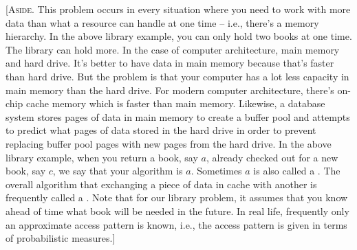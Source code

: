 [\textsc{Aside}. This problem occurs in every situation
where you need to work with more data than what a resource can handle
at one time -- i.e., there's a memory hierarchy.
In the above library example, you can only hold two books at one time.
The library can hold more.
In the case of computer architecture, main memory and hard drive.
It's better to have data in main memory
because that's faster than hard drive. But the problem is that
your computer has a lot less capacity in main memory than the hard drive.
For modern computer architecture, there's on-chip cache memory which is
faster than main memory.
Likewise, a database system stores pages of data in main memory
to create a buffer pool and attempts to predict what pages of data stored
in the hard drive in order to prevent replacing buffer pool pages with
new pages from the hard drive.
In the above library example, when you return a book, say $a$, already checked out
for a new book, say $c$, we say that your algorithm is  $a$.
Sometimes $a$ is also called a .
The overall algorithm that exchanging a piece of data in cache with another
is frequently called a .
Note that for our library problem, it assumes that you know ahead of time
what book will be needed in the future. In real life, frequently
only an approximate access pattern is known, i.e., the access
pattern is given in terms of probabilistic measures.]
